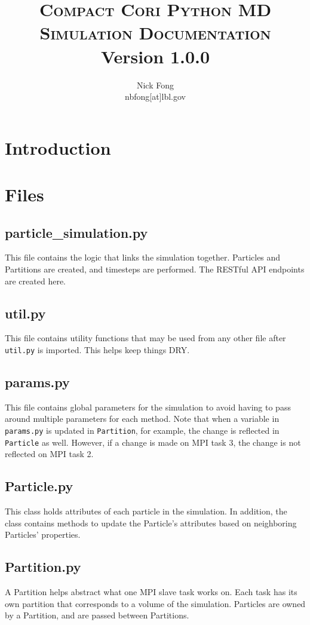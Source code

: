 \documentclass{article}
\def\versionnumber{1.0.0}
\begin{document}
\title{\textsc{Compact Cori Python MD Simulation Documentation}\\ Version \versionnumber}
\author {Nick Fong\\nbfong[at]lbl.gov}
\maketitle
\tableofcontents

\section{Introduction}

\section{Files}
\subsection{particle\_simulation.py}
This file contains the logic that links the simulation together.  Particles and
Partitions are created, and timesteps are performed.  The RESTful API endpoints
are created here.
\subsection{util.py}
This file contains utility functions that may be used from any other file after
\texttt{util.py} is imported.  This helps keep things DRY.
\subsection{params.py}
This file contains global parameters for the simulation to avoid having to pass
around multiple parameters for each method.  Note that when a variable in
\texttt{params.py} is updated in \texttt{Partition}, for example, the change is
reflected in \texttt{Particle} as well.  However, if a change is made on MPI
task 3, the change is not reflected on MPI task 2.
\subsection{Particle.py}
This class holds attributes of each particle in the simulation.  In addition,
the class contains methods to update the Particle's attributes based on
neighboring Particles' properties.
\subsection{Partition.py}
A Partition helps abstract what one MPI slave task works on.  Each task has its
own partition that corresponds to a volume of the simulation.  Particles are
owned by a Partition, and are passed between Partitions.
\end{document}
